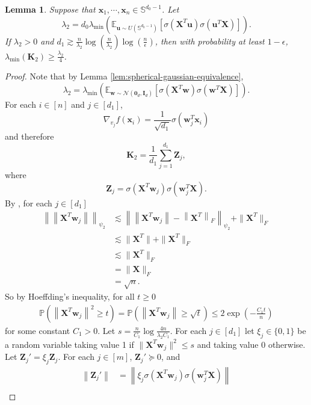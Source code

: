 \documentclass{article}
\newtheorem{lemma}[theorem]{Lemma}
\theoremstyle{definition}
\renewcommand{\P}{\mathbb{P}}
\newcommand{\E}{\mathbb{E}}
\newcommand{\mc}{\mathcal}
\renewcommand{\S}{\mathbb{S}}
\def\vu{{\bm{u}}}
\def\vw{{\bm{w}}}
\def\vx{{\bm{x}}}
\def\mI{{\bm{I}}}
\def\mK{{\bm{K}}}
\def\mX{{\bm{X}}}
\def\mZ{{\bm{Z}}}
\begin{document}
\begin{lemma}
    Suppose that $\vx_1, \cdots, \vx_n \in \S^{d_0 -1 }$. Let
    \[\lambda_2 = d_0\lambda_{\min}\left(\E_{\vu \sim U(\S^{d_0 - 1}) }\left[\sigma( \mX^T \vu )\sigma(\vu^T \mX) \right] \right). \]
    If $\lambda_2 > 0$ and $d_1 \gtrsim  \frac{n}{\lambda_2}  \log\left(\frac{n}{\lambda_2}\right)\log \left(\frac{n}{\epsilon}\right) $, then with probability at least $1 - \epsilon$, $\lambda_{\min}(\mK_2) \geq 
 \frac{\lambda_2}{4}$. 
\end{lemma}
\begin{proof}
    Note that by Lemma \ref{lem:spherical-gaussian-equivalence},
    \[\lambda_2 = \lambda_{\min}\left(\E_{\vw \sim \mc{N}(\bm{0}_d, \mI_d) }\left[ \sigma\left( \mX^T \vw\right) \sigma\left(\vw^T \mX\right) \right] \right). \]
    For each $i \in [n]$ and $j \in [d_1]$,
    \[\nabla_{v_j} f(\vx_i) = \frac{1}{\sqrt{d_1}} \sigma(\vw_j^T \vx_i)\]
    and therefore
    \[\mK_2 = \frac{1}{d_1} \sum_{j = 1}^{d_1}  \mZ_j,\]
    where
    \[\mZ_j = \sigma\left( \mX^T \vw_j\right)\sigma\left(\vw_j^T \mX\right).\]
   By \citet[Theorem 6.3.2]{vershynin2018high}, for each $j \in [d_1]$
   \begin{align*}
       \left\| \left\|\mX^T \vw_j \right\| \right\|_{\psi_2} &\lesssim  \left\| \left\|\mX^T \vw_j \right\| - \left\| \mX^T\right\|_F  \right\|_{\psi_2} + \|\mX^T\|_F\\
       &\lesssim \|\mX^T\| + \|\mX^T\|_F\\
       &\lesssim \|\mX^T\|_F\\
       &= \|\mX\|_F\\
       &= \sqrt{n}.
   \end{align*}
   So by Hoeffding's inequality, for all $t \geq 0$
   \begin{align}
    \P\left(\left\|\mX^T \vw_j \right\|^2 \geq t \right) = \P\left(\left\|\mX^T \vw_j \right\| \geq \sqrt{t} \right) \leq 2\exp\left(-\frac{C_1t}{n } \right)\label{eq:activation-exp-tail}
   \end{align}
   for some constant $C_1 > 0$. Let $s = \frac{n}{C_1}\log \frac{4n}{\lambda_2C_1} $. For each $j \in [d_1]$ let $\xi_j \in \{0, 1\}$ be a random variable taking value 1 if $\|\mX^T \vw_j\|^2 \leq s$ and taking value 0 otherwise. Let $\mZ_j' = \xi_j \mZ_j$. For each $j \in [m]$, $\mZ_j' \succeq 0$, and
   \begin{align*}
       \left\|\mZ_j'\right\| &=  \left\|\xi_j \sigma\left( \mX^T \vw_j \right)\sigma\left(\vw_j^T \mX\right) \right\|\\

\end{align*}
\end{proof}
\end{document}
